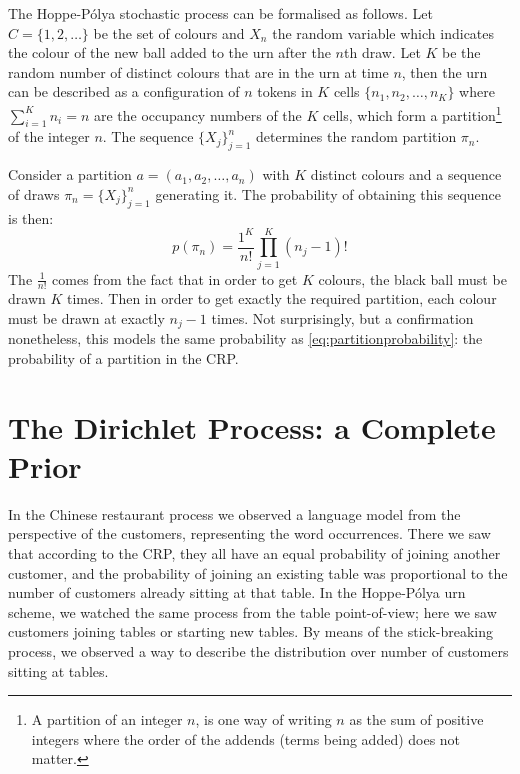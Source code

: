 The Hoppe-P\'olya stochastic process can be formalised as follows. Let $C = \{1,2,\ldots\}$ be the set of colours and $X_n$ the random variable which indicates the colour of the new ball added to the urn after the $n$th draw. Let $K$ be the random number of distinct colours that are in the urn at time $n$, then the urn can be described as a configuration of $n$ tokens in $K$ cells $\{n_1, n_2, \ldots, n_K\}$ where $\sum_{i=1}^K n_i = n$ are the occupancy numbers of the $K$ cells, which form a partition\footnote{A partition of an integer $n$, is one way of writing $n$ as the sum of positive integers where the
order of the addends (terms being added) does not matter.} of the integer $n$. The sequence $\{X_j\}_{j=1}^n$ determines the random partition $\pi_{n}$.

Consider a partition $a = (a_1,a_2,\ldots,a_n)$ with $K$ distinct colours and a sequence of draws $\pi_{n} = \{X_j\}_{j=1}^n$ generating it. The probability of obtaining this sequence is then:
\begin{equation}
	p(\pi_n) = \frac{1^K}{n!}\prod_{j=1}^K (n_j-1)!
\end{equation}
The $\frac{1}{n!}$ comes from the fact that in order to get $K$ colours, the black ball must be drawn $K$ times. Then in order to get exactly the required partition, each colour must be drawn at exactly $n_j-1$ times. Not surprisingly, but a confirmation nonetheless, this models the same probability as \cref{eq:partitionprobability}: the probability of a partition in the CRP.


%


\section{The Dirichlet Process: a Complete Prior}
In the Chinese restaurant process we observed a language model from the perspective of the customers, representing the word occurrences. There we saw that according to the CRP, they all have an equal probability of joining another customer, and the probability of joining an existing table was proportional to the number of customers already sitting at that table. In the Hoppe-P\'olya urn scheme, we watched the same process from the table point-of-view; here we saw customers joining tables or starting new tables. By means of the stick-breaking process, we observed a way to describe the distribution over number of customers sitting at tables.

